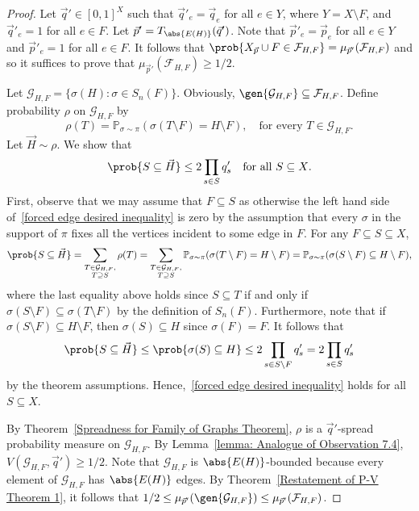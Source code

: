 \documentclass[12pt]{article}
\def\pr{{\mathbb P}}
\begin{document}
\begin{proof}
Let $\vec{q}'\in [0,1]^X$ such that $\vec{q}'_e = \vec{q}_e$ for all $e\in Y$, where $Y = X\setminus F$, and $\vec{q}'_e = 1$ for all $e\in F$. Let $\vec{p}' = T_{\abs{E(H)}}(\vec{q}')$. Note that $\vec{p}'_e = \vec{p}_e$ for all $e\in Y$ and $\vec{p}'_e = 1$ for all $e\in F$. It follows that $\prob{X_{\vec{p}}\cup F\in\mathcal{F}_{H,F}} = \mu_{\vec{p}'}(\mathcal{F}_{H,F})$ and so it suffices to prove that $\mu_{\vec{p}'}(\mathcal{F}_{H,F})\geq 1/2$.

Let $\mathcal{G}_{H,F} = \{\sigma(H): \sigma\in S_n(F)\}$.
Obviously, $\gen{\mathcal{G}_{H,F}}\subseteq \mathcal{F}_{H,F}$.
Define probability $\rho$ on $\mathcal{G}_{H,F}$ by
\[
    \rho(T)=\pr_{\sigma\sim \pi}(\sigma(T\setminus F)=H\setminus F),\quad \text{for every $T\in \mathcal{G}_{H,F}$.}
\]
Let $\vec{H}\sim\rho$. We show that
\begin{equation}
    \label{forced edge desired inequality}
    \prob{S\subseteq\vec{H}}\leq 2\prod\limits_{s\in S} q'_s \quad \text{for all $S\subseteq X$.}
\end{equation}
First, observe that we may assume that $F\subseteq S$ as otherwise the left hand side of~\eqref{forced edge desired inequality} is zero by the assumption that every $\sigma$ in the support of $\pi$ fixes all the vertices incident to some edge in $F$.
For any $F\subseteq S\subseteq X$,
\[
    \prob{S\subseteq\vec{H}} = \displaystyle\sum\limits_{\substack{T\in\mathcal{G}_{H,F},\\T\supseteq S}} \rho(T) = \displaystyle\sum\limits_{\substack{T\in\mathcal{G}_{H,F},\\T\supseteq S}} {\mathbb P}_{\sigma\sim \pi}(\sigma(T\setminus F)=H\setminus F) =\pr_{\sigma\sim\pi}(\sigma(S\setminus F)\subseteq H\setminus F),
\]
where the last equality above holds since $S\subseteq T$ if and only if $\sigma(S\setminus F)\subseteq\sigma(T\setminus F)$ by the definition of $S_n(F)$.  Furthermore, note that if $\sigma(S\setminus F)\subseteq H\setminus F$, then $\sigma(S)\subseteq H$ since $\sigma(F) = F$. It follows that
\[
    \prob{S\subseteq\vec{H}}\leq\prob{\sigma(S)\subseteq H}\leq 2\prod\limits_{s\in S\setminus F} q'_s = 2\prod\limits_{s\in S} q'_s
\]
by the theorem assumptions. Hence,~\eqref{forced edge desired inequality} holds for all $S\subseteq X$. 

By Theorem~\ref{Spreadness for Family of Graphs Theorem},  $\rho$ is a $\vec{q}'$-spread probability measure on $\mathcal{G}_{H,F}$. By Lemma~\ref{lemma: Analogue of Observation 7.4}, $V(\mathcal{G}_{H,F},\vec{q}')\geq 1/2$. Note that $\mathcal{G}_{H,F}$ is $\abs{E(H)}$-bounded because every element of $\mathcal{G}_{H,F}$ has $\abs{E(H)}$ edges. By Theorem~\ref{Restatement of P-V Theorem 1}, it follows that $1/2\leq \mu_{\vec{p}'}(\gen{\mathcal{G}_{H,F}})\leq\mu_{\vec{p}'}(\mathcal{F}_{H,F})$.
\end{proof}
\end{document}
